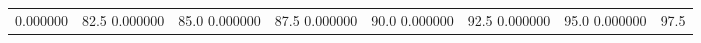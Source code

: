 \begin{table}
\begin{tabular}{llrrrrrr}
0.000000 & 82.5%
0.000000 & 85.0%
0.000000 & 87.5%
0.000000 & 90.0%
0.000000 & 92.5%
0.000000 & 95.0%
0.000000 & 97.5%
\end{tabular}
\end{table}
